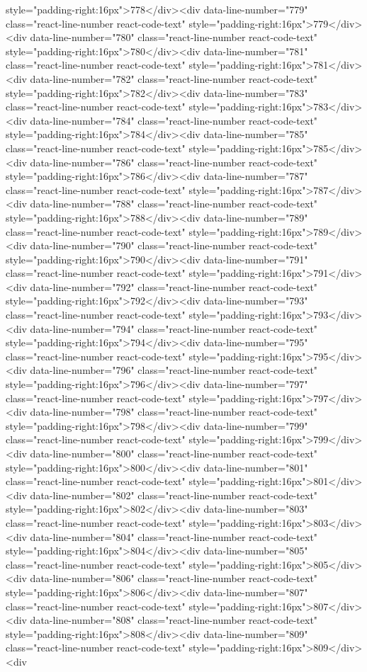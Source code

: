 style="padding-right:16px">778</div><div data-line-number="779" class="react-line-number react-code-text" style="padding-right:16px">779</div><div data-line-number="780" class="react-line-number react-code-text" style="padding-right:16px">780</div><div data-line-number="781" class="react-line-number react-code-text" style="padding-right:16px">781</div><div data-line-number="782" class="react-line-number react-code-text" style="padding-right:16px">782</div><div data-line-number="783" class="react-line-number react-code-text" style="padding-right:16px">783</div><div data-line-number="784" class="react-line-number react-code-text" style="padding-right:16px">784</div><div data-line-number="785" class="react-line-number react-code-text" style="padding-right:16px">785</div><div data-line-number="786" class="react-line-number react-code-text" style="padding-right:16px">786</div><div data-line-number="787" class="react-line-number react-code-text" style="padding-right:16px">787</div><div data-line-number="788" class="react-line-number react-code-text" style="padding-right:16px">788</div><div data-line-number="789" class="react-line-number react-code-text" style="padding-right:16px">789</div><div data-line-number="790" class="react-line-number react-code-text" style="padding-right:16px">790</div><div data-line-number="791" class="react-line-number react-code-text" style="padding-right:16px">791</div><div data-line-number="792" class="react-line-number react-code-text" style="padding-right:16px">792</div><div data-line-number="793" class="react-line-number react-code-text" style="padding-right:16px">793</div><div data-line-number="794" class="react-line-number react-code-text" style="padding-right:16px">794</div><div data-line-number="795" class="react-line-number react-code-text" style="padding-right:16px">795</div><div data-line-number="796" class="react-line-number react-code-text" style="padding-right:16px">796</div><div data-line-number="797" class="react-line-number react-code-text" style="padding-right:16px">797</div><div data-line-number="798" class="react-line-number react-code-text" style="padding-right:16px">798</div><div data-line-number="799" class="react-line-number react-code-text" style="padding-right:16px">799</div><div data-line-number="800" class="react-line-number react-code-text" style="padding-right:16px">800</div><div data-line-number="801" class="react-line-number react-code-text" style="padding-right:16px">801</div><div data-line-number="802" class="react-line-number react-code-text" style="padding-right:16px">802</div><div data-line-number="803" class="react-line-number react-code-text" style="padding-right:16px">803</div><div data-line-number="804" class="react-line-number react-code-text" style="padding-right:16px">804</div><div data-line-number="805" class="react-line-number react-code-text" style="padding-right:16px">805</div><div data-line-number="806" class="react-line-number react-code-text" style="padding-right:16px">806</div><div data-line-number="807" class="react-line-number react-code-text" style="padding-right:16px">807</div><div data-line-number="808" class="react-line-number react-code-text" style="padding-right:16px">808</div><div data-line-number="809" class="react-line-number react-code-text" style="padding-right:16px">809</div><div 